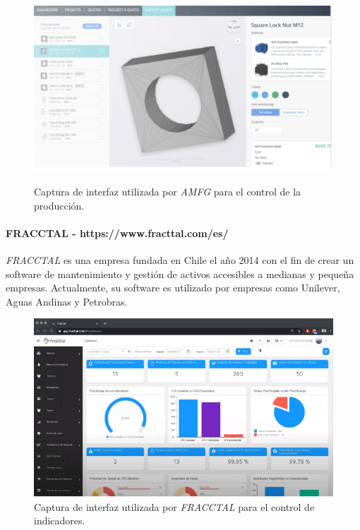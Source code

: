 \begin{figure}[H]
\centering
\includegraphics[scale=0.9]{images/amfg2.png}
\label{amfg2}
\caption{Captura de interfaz utilizada por \textit{AMFG} para el control de la producción.}
\end{figure}

\paragraph{FRACCTAL - https://www.fracttal.com/es/}

\textit{FRACCTAL} es una empresa fundada en Chile el año 2014 con el fin de crear un software de mantenimiento y gestión de activos accesibles a medianas y pequeña empresas. Actualmente, su software es utilizado por empresas como Unilever, Aguas Andinas y Petrobras.

\begin{figure}[H]
\centering
\includegraphics[scale=0.9]{images/fracctal.png}
\caption{Captura de interfaz utilizada por \textit{FRACCTAL} para el control de indicadores.}
\label{fracctal}
\end{figure}


